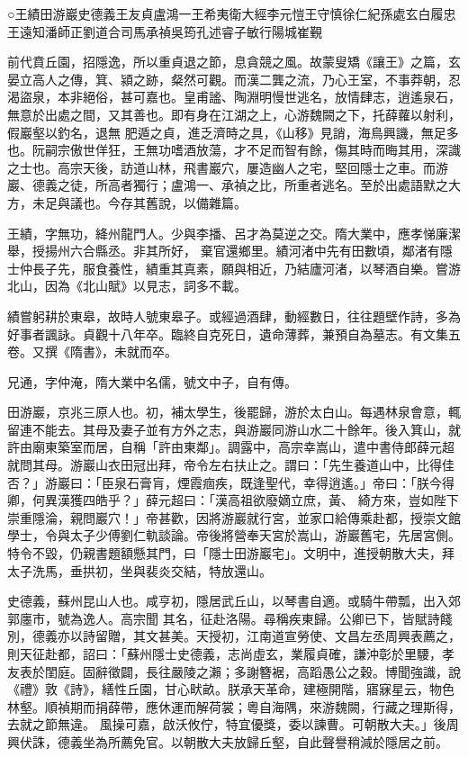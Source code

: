 
\begin{pinyinscope}

 ○王績田游巖史德義王友貞盧鴻一王希夷衛大經李元愷王守慎徐仁紀孫處玄白履忠
 王遠知潘師正劉道合司馬承禎吳筠孔述睿子敏行陽城崔覲



 前代賁丘園，招隱逸，所以重貞退之節，息貪競之風。故蒙叟矯《讓王》之篇，玄晏立高人之傳，箕、潁之跡，粲然可觀。而漢二龔之流，乃心王室，不事莽朝，忍渴盜泉，本非絕俗，甚可嘉也。皇甫謐、陶淵明慢世逃名，放情肆志，逍遙泉石，無意於出處之間，又其善也。即有身在江湖之上，心游魏闕之下，托薛蘿以射利，假巖壑以釣名，退無
 肥遁之貞，進乏濟時之具，《山移》見誚，海鳥興譏，無足多也。阮嗣宗傲世佯狂，王無功嗜酒放蕩，才不足而智有餘，傷其時而晦其用，深識之士也。高宗天後，訪道山林，飛書巖穴，屢造幽人之宅，堅回隱士之車。而游巖、德義之徒，所高者獨行；盧鴻一、承禎之比，所重者逃名。至於出處語默之大方，未足與議也。今存其舊說，以備雜篇。



 王績，字無功，絳州龍門人。少與李播、呂才為莫逆之交。隋大業中，應孝悌廉潔舉，授揚州六合縣丞。非其所好，
 棄官還鄉里。績河渚中先有田數頃，鄰渚有隱士仲長子先，服食養性，績重其真素，願與相近，乃結廬河渚，以琴酒自樂。嘗游北山，因為《北山賦》以見志，詞多不載。



 績嘗躬耕於東皋，故時人號東皋子。或經過酒肆，動經數日，往往題壁作詩，多為好事者諷詠。貞觀十八年卒。臨終自克死日，遺命薄葬，兼預自為墓志。有文集五卷。又撰《隋書》，未就而卒。



 兄通，字仲淹，隋大業中名儒，號文中子，自有傳。



 田游巖，京兆三原人也。初，補太學生，後罷歸，游於太白山。每遇林泉會意，輒留連不能去。其母及妻子並有方外之志，與游巖同游山水二十餘年。後入箕山，就許由廟東築室而居，自稱「許由東鄰」。調露中，高宗幸嵩山，遣中書侍郎薛元超就問其母。游巖山衣田冠出拜，帝令左右扶止之。謂曰：「先生養道山中，比得佳否？」游巖曰：「臣泉石膏肓，煙霞痼疾，既逢聖代，幸得逍遙。」帝曰：「朕今得卿，何異漢獲四皓乎？」薛元超曰：「漢高祖欲廢嫡立庶，黃、
 綺方來，豈如陛下崇重隱淪，親問巖穴！」帝甚歡，因將游巖就行宮，並家口給傳乘赴都，授崇文館學士，令與太子少傅劉仁軌談論。帝後將營奉天宮於嵩山，游巖舊宅，先居宮側。特令不毀，仍親書題額懸其門，曰「隱士田游巖宅」。文明中，進授朝散大夫，拜太子洗馬，垂拱初，坐與裴炎交結，特放還山。



 史德義，蘇州昆山人也。咸亨初，隱居武丘山，以琴書自適。或騎牛帶瓢，出入郊郭廛市，號為逸人。高宗聞
 其名，征赴洛陽。尋稱疾東歸。公卿已下，皆賦詩餞別，德義亦以詩留贈，其文甚美。天授初，江南道宣勞使、文昌左丞周興表薦之，則天征赴都，詔曰：「蘇州隱士史德義，志尚虛玄，業履貞確，謙沖彰於里騕，孝友表於閨庭。固辭徵闢，長往嚴陵之瀨；多謝簪裾，高蹈愚公之穀。博聞強識，說《禮》敦《詩》，繕性丘園，甘心畎畝。朕承天革命，建極開階，寤寐星云，物色林壑。順禎期而捐薛帶，應休運而解荷裳；粵自海隅，來游魏闕，行藏之理斯得，去就之節無違。
 風操可嘉，啟沃攸佇，特宜優獎，委以諫曹。可朝散大夫。」後周興伏誅，德義坐為所薦免官。以朝散大夫放歸丘壑，自此聲譽稍減於隱居之前。




\end{pinyinscope}
